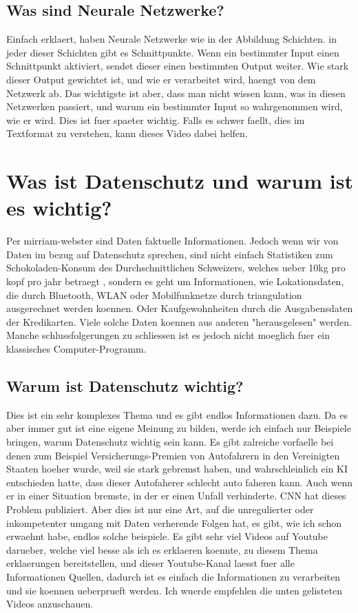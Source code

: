 \documentclass{report}
\begin{document}
\subsection{Was sind Neurale Netzwerke?}
Einfach erklaert, haben Neurale Netzwerke wie in der Abbildung Schichten. in jeder dieser Schichten gibt es Schnittpunkte. Wenn ein bestimmter Input einen Schnittpunkt aktiviert, sendet dieser einen bestimmten Output weiter. Wie stark dieser Output gewichtet ist, und wie er verarbeitet wird, haengt von dem Netzwerk ab.
Das wichtigste ist aber, dass man nicht wissen kann, was in diesen Netzwerken passiert, und warum ein bestimmter Input so wahrgenommen wird, wie er wird. Dies ist fuer spaeter wichtig.
\newline
Falls es schwer faellt, dies im Textformat zu verstehen, kann dieses Video \citep{how-ai-is-trained} dabei helfen.

\section{Was ist Datenschutz und warum ist es wichtig?}
Per mirriam-webster \citep{data-def} sind Daten faktuelle Informationen.
Jedoch wenn wir von Daten im bezug auf Datenschutz sprechen, sind nicht einfach Statistiken zum Schokoladen-Konsum des Durchschnittlichen Schweizers, welches ueber 10kg pro kopf pro jahr betraegt \citep{schokoladenkonsum-pro-kops-schweiz},
sondern es geht um Informationen, wie Lokationsdaten, die durch Bluetooth, WLAN oder Mobilfunknetze durch triangulation ausgerechnet werden koennen. Oder Kaufgewohnheiten durch die Ausgabensdaten der Kredikarten.
Viele solche Daten koennen aus anderen "herausgelesen" werden. Manche schlussfolgerungen zu schliessen ist es jedoch nicht moeglich fuer ein klassisches Computer-Programm.
\subsection{Warum ist Datenschutz wichtig?}
Dies ist ein sehr komplexes Thema und es gibt endlos Informationen dazu. Da es aber immer gut ist eine eigene Meinung zu bilden, werde ich einfach nur Beispiele bringen, warum Datenschutz wichtig sein kann.
\newline
Es gibt zalreiche vorfaelle bei denen zum Beispiel Versicherungs-Premien von Autofahrern in den Vereinigten Staaten hoeher wurde, weil sie stark gebremst haben, und wahrschleinlich ein KI entschieden hatte, dass dieser Autofaherer schlecht auto faheren kann. Auch wenn er in einer Situation bremste, in der er einen Unfall verhinderte. CNN hat dieses Problem publiziert. \citep{car-syping-cnn}
\newline
Aber dies ist nur eine Art, auf die unregulierter oder inkompetenter umgang mit Daten verherende Folgen hat, es gibt, wie ich schon erwaehnt habe, endlos solche beispiele.
\newline
Es gibt sehr viel Videos auf Youtube darueber, welche viel besse als ich es erklaeren koennte, zu diesem Thema erklaerungen bereitstellen, und dieser Youtube-Kanal \citep{tha-hated-one-yt-channel} laesst fuer alle Informationen Quellen, dadurch ist es einfach die Informationen zu verarbeiten und sie koennen ueberprueft werden.
Ich wuerde empfehlen die unten gelisteten Videos anzuschauen.
\end{document}
